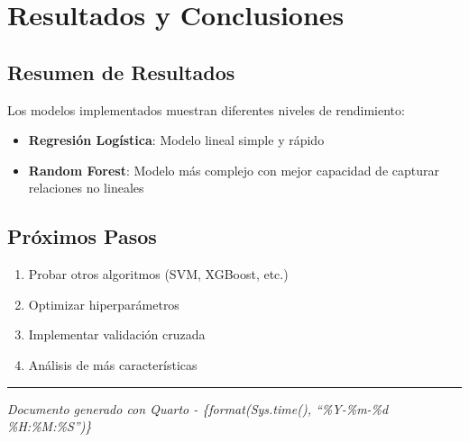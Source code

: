 \documentclass[
]{article}
\providecommand{\tightlist}{%
  \setlength{\itemsep}{0pt}\setlength{\parskip}{0pt}}
\begin{document}
\section{Resultados y Conclusiones}\label{resultados-y-conclusiones}

\subsection{Resumen de Resultados}\label{resumen-de-resultados}

Los modelos implementados muestran diferentes niveles de rendimiento:

\begin{itemize}
\tightlist
\item
  \textbf{Regresión Logística}: Modelo lineal simple y rápido
\item
  \textbf{Random Forest}: Modelo más complejo con mejor capacidad de
  capturar relaciones no lineales
\end{itemize}

\subsection{Próximos Pasos}\label{pruxf3ximos-pasos}

\begin{enumerate}
\def\labelenumi{\arabic{enumi}.}
\tightlist
\item
  Probar otros algoritmos (SVM, XGBoost, etc.)
\item
  Optimizar hiperparámetros
\item
  Implementar validación cruzada
\item
  Análisis de más características
\end{enumerate}

\begin{center}\rule{0.5\linewidth}{0.5pt}\end{center}

\emph{Documento generado con Quarto - \{format(Sys.time(), ``\%Y-\%m-\%d
\%H:\%M:\%S'')\}}
\end{document}
